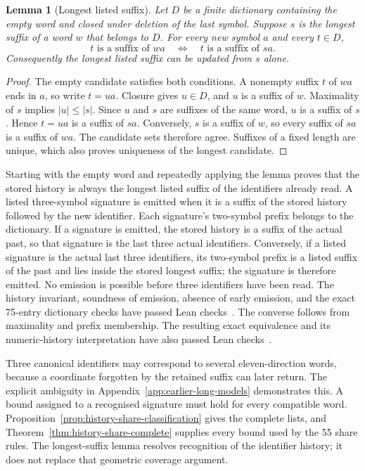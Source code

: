 \documentclass[11pt,a4paper]{article}
\newtheorem{lemma}[theorem]{Lemma}
\theoremstyle{definition}
\theoremstyle{remark}
\begin{document}
\begin{lemma}[Longest listed suffix]\label{lem:longest-suffix}
Let $D$ be a finite dictionary containing the empty word and closed under deletion of the last symbol. Suppose $s$ is the longest suffix of a word $w$ that belongs to $D$. For every new symbol $a$ and every $t\in D$,
\[
t\text{ is a suffix of }wa
\quad\Longleftrightarrow\quad
t\text{ is a suffix of }sa.
\]
Consequently the longest listed suffix can be updated from $s$ alone.
\end{lemma}
\begin{proof}
The empty candidate satisfies both conditions. A nonempty suffix $t$ of $wa$ ends in $a$, so write $t=ua$. Closure gives $u\in D$, and $u$ is a suffix of $w$. Maximality of $s$ implies $|u|\le|s|$. Since $u$ and $s$ are suffixes of the same word, $u$ is a suffix of $s$. Hence $t=ua$ is a suffix of $sa$. Conversely, $s$ is a suffix of $w$, so every suffix of $sa$ is a suffix of $wa$. The candidate sets therefore agree. Suffixes of a fixed length are unique, which also proves uniqueness of the longest candidate.
\end{proof}

Starting with the empty word and repeatedly applying the lemma proves that the stored history is always the longest listed suffix of the identifiers already read. A listed three-symbol signature is emitted when it is a suffix of the stored history followed by the new identifier. Each signature's two-symbol prefix belongs to the dictionary. If a signature is emitted, the stored history is a suffix of the actual past, so that signature is the last three actual identifiers. Conversely, if a listed signature is the actual last three identifiers, its two-symbol prefix is a listed suffix of the past and lies inside the stored longest suffix; the signature is therefore emitted. No emission is possible before three identifiers have been read. The history invariant, soundness of emission, absence of early emission, and the exact 75-entry dictionary checks have passed Lean checks~\cite{historyarchive}. The converse follows from maximality and prefix membership. The resulting exact equivalence and its numeric-history interpretation have also passed Lean checks~\cite{interfacearchive}.

Three canonical identifiers may correspond to several eleven-direction words, because a coordinate forgotten by the retained suffix can later return. The explicit ambiguity in Appendix~\ref{app:earlier-long-models} demonstrates this. A bound assigned to a recognised signature must hold for every compatible word. Proposition~\ref{prop:history-share-classification} gives the complete lists, and Theorem~\ref{thm:history-share-complete} supplies every bound used by the 55 share rules. The longest-suffix lemma resolves recognition of the identifier history; it does not replace that geometric coverage argument.
\end{document}
